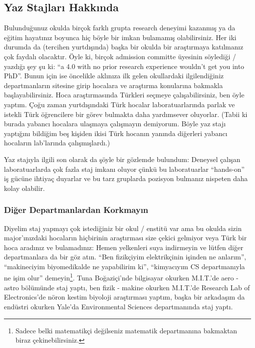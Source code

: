 \documentclass[12pt]{article}
\begin{document}
\subsection{Yaz Stajları Hakkında}
Bulunduğunuz okulda birçok farklı grupta research deneyimi kazanmış ya da eğitim hayatınız boyunca hiç böyle bir imkan bulamamış olabilirsiniz. Her iki durumda da (tercihen yurtdışında) başka bir okulda bir araştırmaya katılmanız çok faydalı olacaktır. Öyle ki, birçok admission committe üyesinin söylediği / yazdığı şey şu ki: “a 4.0 with no prior research experience wouldn’t get you into PhD”. Bunun için ise öncelikle aklınıza ilk gelen okullardaki ilgilendiğiniz departmanların sitesine girip hocalara ve araştırma konularına bakmakla başlayabilirsiniz. Hoca araştırmasında Türkleri seçmeye çalışabilirsiniz, ben öyle yaptım. Çoğu zaman yurtdışındaki Türk hocalar laboratuarlarında parlak ve istekli Türk öğrencilere bir görev bulmakta daha yardımsever oluyorlar. (Tabii ki burada yabancı hocalara ulaşmaya çalışmayın demiyorum. Böyle yaz stajı yaptığını bildiğim beş kişiden ikisi Türk hocanın yanında diğerleri yabancı hocaların lab’larında çalışmışlardı.)

Yaz stajıyla ilgili son olarak da şöyle bir gözlemde bulundum: Deneysel çalışan laboratuarlarda çok fazla staj imkanı oluyor çünkü bu laboratuarlar “hands-on” iş gücüne ihtiyaç duyarlar ve bu tarz gruplarda pozisyon bulmanız nispeten daha kolay olabilir.

\subsubsection{Diğer Departmanlardan Korkmayın}
Diyelim staj yapmayı çok istediğiniz bir okul / enstitü var ama bu okulda sizin major’ınızdaki hocaların hiçbirinin araştırması size çekici gelmiyor veya Türk bir hoca aradınız ve bulamadınız: Hemen yelkenleri suya indirmeyin ve lütfen diğer departmanlara da bir göz atın. “Ben fizikçiyim elektrikçinin işinden ne anlarım”, “makineciyim biyomedikalde ne yapabilirim ki”, “kimyacıyım CS departmanıyla ne işim olur” demeyin\footnote{Sadece belki matematikçi değilseniz matematik departmanına bakmaktan biraz çekinebilirsiniz.}. Tuna Boğaziçi’nde bilgisayar okurken M.I.T.’de aero - astro bölümünde staj yaptı, ben fizik - makine okurken M.I.T.’de Research Lab of Electronics’de nöron kestim biyoloji araştırması yaptım, başka bir arkadaşım da endüstri okurken Yale’da Environmental Sciences departmanında staj yaptı.
\end{document}
